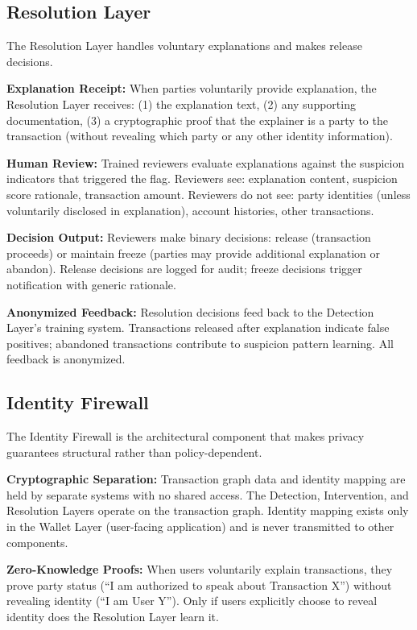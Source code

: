 \documentclass[11pt]{article}
\begin{document}
\subsection{Resolution Layer}

The Resolution Layer handles voluntary explanations and makes release decisions.

\textbf{Explanation Receipt:} When parties voluntarily provide explanation, the Resolution Layer receives: (1) the explanation text, (2) any supporting documentation, (3) a cryptographic proof that the explainer is a party to the transaction (without revealing which party or any other identity information).

\textbf{Human Review:} Trained reviewers evaluate explanations against the suspicion indicators that triggered the flag. Reviewers see: explanation content, suspicion score rationale, transaction amount. Reviewers do not see: party identities (unless voluntarily disclosed in explanation), account histories, other transactions.

\textbf{Decision Output:} Reviewers make binary decisions: release (transaction proceeds) or maintain freeze (parties may provide additional explanation or abandon). Release decisions are logged for audit; freeze decisions trigger notification with generic rationale.

\textbf{Anonymized Feedback:} Resolution decisions feed back to the Detection Layer's training system. Transactions released after explanation indicate false positives; abandoned transactions contribute to suspicion pattern learning. All feedback is anonymized.

\subsection{Identity Firewall}

The Identity Firewall is the architectural component that makes privacy guarantees structural rather than policy-dependent.

\textbf{Cryptographic Separation:} Transaction graph data and identity mapping are held by separate systems with no shared access. The Detection, Intervention, and Resolution Layers operate on the transaction graph. Identity mapping exists only in the Wallet Layer (user-facing application) and is never transmitted to other components.

\textbf{Zero-Knowledge Proofs:} When users voluntarily explain transactions, they prove party status (``I am authorized to speak about Transaction X'') without revealing identity (``I am User Y''). Only if users explicitly choose to reveal identity does the Resolution Layer learn it.
\end{document}
